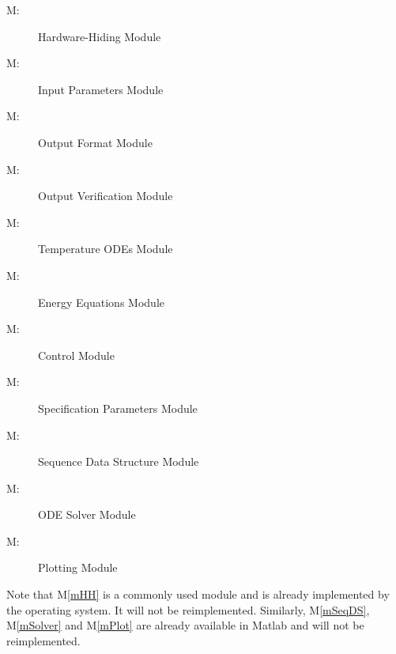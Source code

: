 \documentclass[12pt]{article}
\newcounter{mnum}
\newcommand{\mthemnum}{M\themnum}
\newcommand{\mref}[1]{M\ref{#1}}
\begin{document}
\begin{description}
\item [ \mthemnum \label{mHH}:] Hardware-Hiding Module
\item [ \mthemnum \label{mParams}:] Input Parameters Module
\item [ \mthemnum \label{mOutput}:] Output Format Module
\item [ \mthemnum \label{mVerifyOut}:] Output Verification Module
\item [ \mthemnum \label{mODEs}:] Temperature ODEs Module
\item [ \mthemnum \label{mEnergy}:] Energy Equations Module
\item [ \mthemnum \label{mControl}:] Control Module
\item [ \mthemnum \label{mSpecParams}:] Specification Parameters Module
\item [ \mthemnum \label{mSeqDS}:] Sequence Data Structure Module
\item [ \mthemnum \label{mSolver}:] ODE Solver Module
\item [ \mthemnum \label{mPlot}:] Plotting Module
\end{description}

Note that \mref{mHH} is a commonly used module and is already implemented by the operating
system.  It will not be reimplemented.  Similarly, \mref{mSeqDS}, \mref{mSolver}
and \mref{mPlot} are already available in Matlab and will not be reimplemented.
\end{document}
